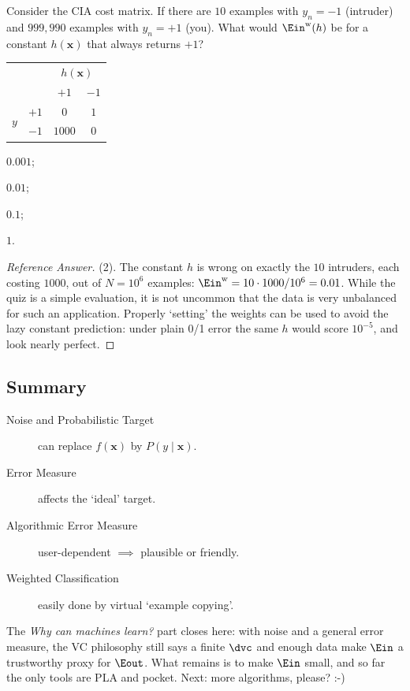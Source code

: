 \begin{exercise}
    Consider the CIA cost matrix. If there are \(10\) examples with
    \(y_n = -1\) (intruder) and \(999{,}990\) examples with \(y_n = +1\)
    (you). What would \(\Ein^{\mathrm{w}}(h)\) be for a constant \(h(\bm{x})\)
    that always returns \(+1\)?
    \begin{center}
        \solidrules
        \begin{tabular}{@{}cc|cc@{}}
            \toprule
            & & \multicolumn{2}{c}{\(h(\bm{x})\)}\\
            & & \(+1\) & \(-1\)\\
            \midrule
            \multirow{2}{*}{\(y\)} & \(+1\) & \(0\) & \(1\)\\
            & \(-1\) & \(1000\) & \(0\)\\
            \bottomrule
        \end{tabular}
        \qquad
        \begin{enumerate*}[(1)]
            \item \(0.001\); \item \(0.01\); \item \(0.1\); \item \(1\).
        \end{enumerate*}
    \end{center}
\end{exercise}

\begin{proof}[Reference Answer]
    (2). The constant \(h\) is wrong on exactly the \(10\) intruders, each
    costing \(1000\), out of \(N = 10^6\) examples: \(\Ein^{\mathrm{w}} = 10
    \cdot 1000 / 10^6 = 0.01\). While the quiz is a simple evaluation, it is not
    uncommon that the data is very unbalanced for such an application. Properly
    `setting' the weights can be used to avoid the lazy constant prediction:
    under plain 0/1 error the same \(h\) would score \(10^{-5}\), and look
    nearly perfect.
\end{proof}

\hrulebar

\subsection*{Summary}

\begin{description}
    \item[Noise and Probabilistic Target] can replace \(f(\bm{x})\) by \(P(y
        \mid \bm{x})\).
    \item[Error Measure] affects the `ideal' target.
    \item[Algorithmic Error Measure] user-dependent \(\implies\) plausible or
        friendly.
    \item[Weighted Classification] easily done by virtual `example copying'.
\end{description}

The \emph{Why can machines learn?} part closes here: with noise and a general
error measure, the VC philosophy still says a finite \(\dvc\) and enough data
make \(\Ein\) a trustworthy proxy for \(\Eout\). What remains is to make
\(\Ein\) small, and so far the only tools are PLA and pocket. Next: more
algorithms, please? :-)
